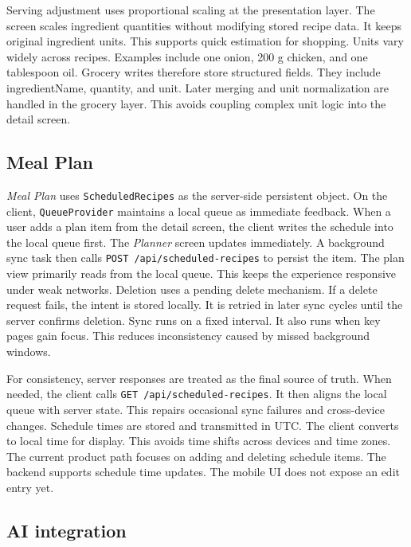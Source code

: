 \documentclass[journal]{IEEEtran}
\begin{document}
Serving adjustment uses proportional scaling at the presentation layer. The screen scales ingredient quantities without modifying stored recipe data. It keeps original ingredient units. This supports quick estimation for shopping. Units vary widely across recipes. Examples include one onion, 200 g chicken, and one tablespoon oil. Grocery writes therefore store structured fields. They include ingredientName, quantity, and unit. Later merging and unit normalization are handled in the grocery layer. This avoids coupling complex unit logic into the detail screen.

\subsection{Meal Plan}

\textit{Meal Plan} uses \texttt{ScheduledRecipes} as the server-side persistent object. On the client, \texttt{QueueProvider} maintains a local queue as immediate feedback. When a user adds a plan item from the detail screen, the client writes the schedule into the local queue first. The \textit{Planner} screen updates immediately. A background sync task then calls \texttt{POST /api/scheduled-recipes} to persist the item. The plan view primarily reads from the local queue. This keeps the experience responsive under weak networks. Deletion uses a pending delete mechanism. If a delete request fails, the intent is stored locally. It is retried in later sync cycles until the server confirms deletion. Sync runs on a fixed interval. It also runs when key pages gain focus. This reduces inconsistency caused by missed background windows.

For consistency, server responses are treated as the final source of truth. When needed, the client calls \texttt{GET /api/scheduled-recipes}. It then aligns the local queue with server state. This repairs occasional sync failures and cross-device changes. Schedule times are stored and transmitted in UTC. The client converts to local time for display. This avoids time shifts across devices and time zones. The current product path focuses on adding and deleting schedule items. The backend supports schedule time updates. The mobile UI does not expose an edit entry yet.

\subsection{AI integration}
\end{document}
